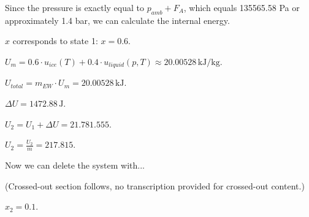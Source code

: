 Since the pressure is exactly equal to \( p_{amb} + F_A \), which equals 135565.58 Pa or approximately 1.4 bar, we can calculate the internal energy.  

\( x \) corresponds to state 1: \( x = 0.6 \).  

\( U_{m} = 0.6 \cdot u_{ice}(T) + 0.4 \cdot u_{liquid}(p, T) \approx 20.00528 \, \text{kJ/kg} \).  

\( U_{total} = m_{EW} \cdot U_{m} = 20.00528 \, \text{kJ} \).  

\( \Delta U = 1472.88 \, \text{J} \).  

\( U_2 = U_1 + \Delta U = 21.781.555 \).  

\( U_2 = \frac{U_2}{m} = 217.815 \).  

Now we can delete the system with...  

(Crossed-out section follows, no transcription provided for crossed-out content.)  

\( x_2 = 0.1 \).